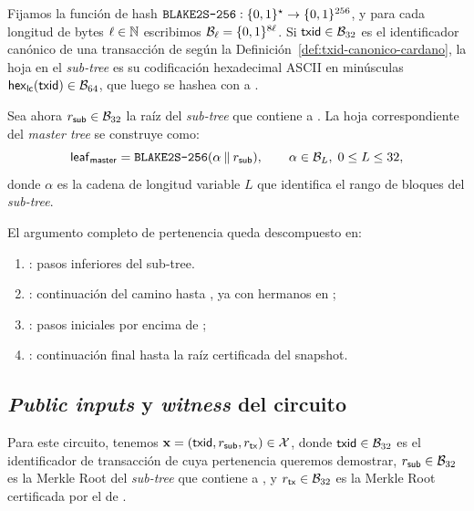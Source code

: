 Fijamos la función de hash $\texttt{BLAKE2S-256}: \{0,1\}^{\star} \to \{0,1\}^{256}$, y para cada longitud de bytes $\ell \in \mathbb{N}$ escribimos $\mathcal{B}_{\ell} = \{0,1\}^{8\ell}$. Si $\mathsf{txid} \in \mathcal{B}_{32}$ es el identificador canónico de una transacción de \Cardano según la Definición~\ref{def:txid-canonico-cardano}, la hoja en el \textit{sub-tree} es su codificación hexadecimal ASCII en minúsculas $\mathsf{hex}_{\mathsf{lc}}(\mathsf{txid}) \in \mathcal{B}_{64}$, que luego se hashea con \BLAKETwoSTwoFiveSix a .

Sea ahora $r_{\mathsf{sub}} \in \mathcal{B}_{32}$ la raíz del \textit{sub-tree} que contiene a \TxId. La hoja correspondiente del \textit{master tree} se construye como:
$$\mathsf{leaf}_{\mathsf{master}} = \texttt{BLAKE2S-256}(\alpha \mathbin{\|} r_{\mathsf{sub}}), \qquad \alpha \in \mathcal{B}_{L},\; 0 \leq L \leq 32,$$
donde $\alpha$ es la cadena \RangeAscii de longitud variable $L$ que identifica el rango de bloques del \textit{sub-tree}.

El argumento completo de pertenencia queda descompuesto en:
\begin{enumerate}[noitemsep]
  \item \SubPrefix: pasos inferiores del sub-tree.
  \item \SubUpper: continuación del camino hasta \SnapshotSubRoot, ya con hermanos en ;
  \item \MasterPrefix: pasos iniciales por encima de \MasterLeaf;
  \item \MasterUpper: continuación final hasta la raíz certificada del snapshot.
\end{enumerate}

\subsection{\textit{Public inputs} y \textit{witness} del circuito}
\label{subsec:tx-snapshot-membership-public-inputs-y-witness-del-circuito}

Para este circuito, tenemos $\mathbf{x} = (\mathsf{txid},r_{\mathsf{sub}},r_{\mathsf{tx}}) \in \mathcal{X}$, donde $\mathsf{txid} \in \mathcal{B}_{32}$ es el identificador de transacción de \Cardano cuya pertenencia queremos demostrar, $r_{\mathsf{sub}} \in \mathcal{B}_{32}$ es la Merkle Root del \textit{sub-tree} que contiene a \TxId, y $r_{\mathsf{tx}} \in \mathcal{B}_{32}$ es la Merkle Root certificada por el \TransactionSnapshotCertificate de \Mithril.

